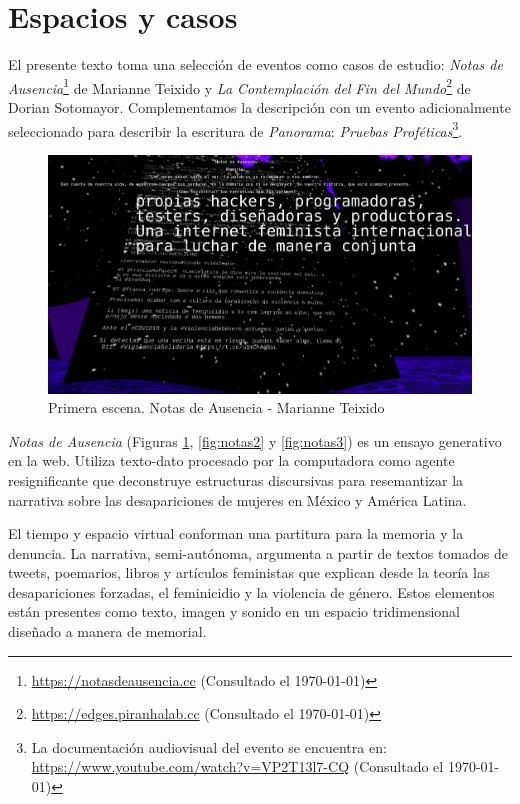 
\section*{Espacios y casos} %

El presente texto toma una selección de eventos como casos de estudio: \textit{Notas de Ausencia}\footnote{\url{https://notasdeausencia.cc} (Consultado el \today)} de Marianne Teixido  y \textit{La Contemplación del Fin del Mundo}\footnote{\url{https://edges.piranhalab.cc} (Consultado el \today)} de Dorian Sotomayor. Complementamos la descripción con un evento adicionalmente seleccionado para describir la escritura de \textit{Panorama}: \textit{Pruebas Proféticas}\footnote{La documentación audiovisual del evento se encuentra en: \url{https://www.youtube.com/watch?v=VP2T13l7-CQ} (Consultado el \today)}. %

\begin{figure}
  \includegraphics[width=\textwidth]{img/figura1.png}
  \caption{Primera escena. Notas de Ausencia - Marianne Teixido}
  \label{fig:notas1}
\end{figure}


\emph{Notas de Ausencia} (Figuras \ref{fig:notas1}, \ref{fig:notas2} y \ref{fig:notas3}) es un ensayo generativo en la web. Utiliza texto-dato procesado por la computadora como agente resignificante que deconstruye estructuras discursivas para resemantizar la narrativa sobre las desapariciones de mujeres en México y América Latina.

El tiempo y espacio virtual conforman una partitura para la memoria y la denuncia. La narrativa, semi-autónoma, argumenta a partir de textos tomados de tweets, poemarios, libros y artículos feministas que explican desde la teoría las desapariciones forzadas, el feminicidio y la violencia de género. Estos elementos están presentes como texto, imagen y sonido en un espacio tridimensional diseñado a manera de memorial.


